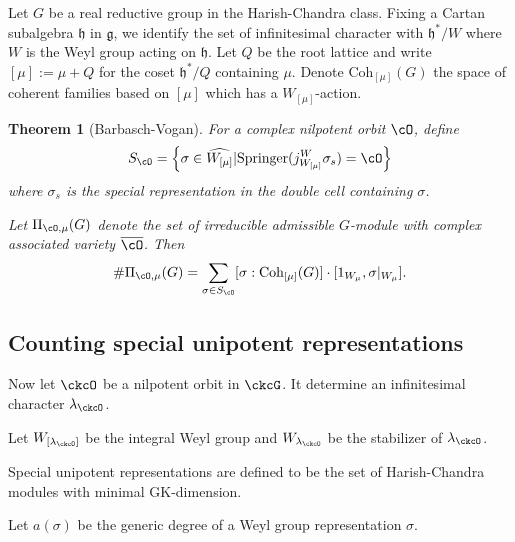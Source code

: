 \documentclass[12pt,a4paper]{amsart}
\numberwithin{equation}{section}
\newtheorem{thm}{Theorem}[section]
\theoremstyle{remark}
\def\lamck{\lambda_\ckcO}
\def\WLamck{W_{[\lambda_{\ckcO}]}}
\def\Wlamck{W_{\lamck}}
\def\Spr{\mathrm{Springer}}
\begin{document}
Let $G$ be a real reductive group in the Harish-Chandra class.
Fixing a Cartan subalgebra $\mathfrak h$ in $\mathfrak g$,
we identify the set of infinitesimal character with $\mathfrak h^{*}/W$
where $W$ is the Weyl group acting on $\mathfrak h$.
Let $Q$ be the root lattice and write $[\mu]:= \mu+Q$ for the coset
$\mathfrak h^{*}/Q$ containing $\mu$.
Denote
$\mathrm{Coh}_{[\mu]}(G)$ the space of coherent families based on $[\mu]$ which has a $W_{[\mu]}$-action.

\begin{thm}[Barbasch-Vogan]\label{thm:count}
  For a complex nilpotent orbit $\cO$,
  define
  \[
    S_{\cO} = \left\{\sigma \in \widehat{W_{[\mu]}}|
      \Spr(j_{W_{[\mu]}}^{W} \sigma_{s}) = \cO
    \right\}
  \]
  where $\sigma_{s}$ is the special representation in the double cell containing
  $\sigma$.

  Let $\Pi_{\cO,\mu}(G)$ denote the set of irreducible admissible $G$-module with
  complex associated variety $\overline{\cO}$.
  Then
  \[
    \# \Pi_{\cO,\mu}(G) =
    \sum_{\sigma\in S_{\cO}} [\sigma: \mathrm{Coh}_{[\mu]}(G)] \cdot
    [1_{W_{\mu}}, \sigma|_{W_{\mu}}].
  \]
\end{thm}

\subsection{Counting special unipotent representations}

Now let $\ckcO$ be a nilpotent orbit in $\ckcG$.
It determine an infinitesimal character $\lamck$.

Let $\WLamck$ be the integral Weyl group and $\Wlamck$ be the stabilizer of
$\lamck$.

Special unipotent representations are defined to be the set of
Harish-Chandra modules with minimal GK-dimension.

Let $a(\sigma)$ be the generic degree of a Weyl group representation $\sigma$.
\end{document}
